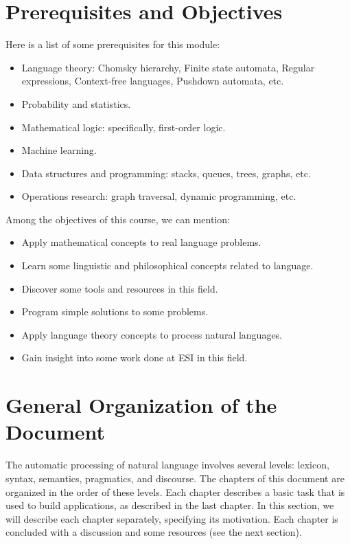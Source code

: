 \documentclass{KBook}
\begin{document}
\section*{Prerequisites and Objectives}

Here is a list of some prerequisites for this module:
\begin{itemize}
\item Language theory: Chomsky hierarchy, Finite state automata, Regular expressions, Context-free languages, Pushdown automata, etc.
\item Probability and statistics.
\item Mathematical logic: specifically, first-order logic.
\item Machine learning.
\item Data structures and programming: stacks, queues, trees, graphs, etc.
\item Operations research: graph traversal, dynamic programming, etc.
\end{itemize}

Among the objectives of this course, we can mention:
\begin{itemize}
\item Apply mathematical concepts to real language problems.
\item Learn some linguistic and philosophical concepts related to language.
\item Discover some tools and resources in this field.
\item Program simple solutions to some problems.
\item Apply language theory concepts to process natural languages.
\item Gain insight into some work done at ESI in this field.
\end{itemize}

\section*{General Organization of the Document}

The automatic processing of natural language involves several levels: lexicon, syntax, semantics, pragmatics, and discourse.
The chapters of this document are organized in the order of these levels.
Each chapter describes a basic task that is used to build applications, as described in the last chapter.
In this section, we will describe each chapter separately, specifying its motivation.
Each chapter is concluded with a discussion and some resources (see the next section).
\end{document}
